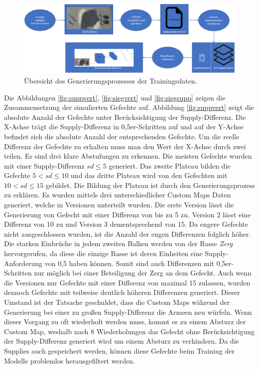 \begin{figure}[H]
\thispagestyle{empty}
\centering
\includegraphics[angle=90,scale=0.6]{pictures/grafiken/Folie2}
\caption{Übersicht des Generierungsprozesses der Trainingsdaten.}
\label{fig:overview1}
\end{figure}

Die Abbildungen \ref{fig:suppvert}, \ref{fig:siegvert} und \ref{fig:siegsupp} zeigen die Zusammensetzung der simulierten Gefechte auf. Abbildung \ref{fig:suppvert} zeigt die absolute Anzahl der Gefechte unter Berücksichtigung der Supply-Differenz. Die X-Achse trägt die Supply-Differenz in 0,5er-Schritten auf und auf der Y-Achse befindet sich die absolute Anzahl der entsprechenden Gefechte. Um die reelle Differenz der Gefechte zu erhalten muss man den Wert der X-Achse durch zwei teilen. Es sind drei klare Abstufungen zu erkennen. Die meisten Gefechte wurden mit einer Supply-Differenz $sd \leq 5$ generiert. Das zweite Plateau bilden die Gefechte $5 < sd \leq 10$ und das dritte Plateau wird von den Gefechten mit $10 < sd \leq 15$  gebildet. Die Bildung der Plateau ist durch den Generierungsprozess zu erklären. Es wurden mittels drei unterschiedlicher Custom Maps Daten generiert, welche in Versionen unterteilt wurden. Die erste Version lässt die Generierung von Gefecht mit einer Differenz von bis zu 5 zu. Version 2 lässt eine Differenz von 10 zu und Version 3 dementsprechend von 15. Da engere Gefechte nicht ausgeschlossen wurden, ist die Anzahl der engen Differenzen folglich höher. Die starken Einbrüche in jedem zweiten Balken werden von der Rasse \textit{Zerg} hervorgerufen, da diese die einzige Rasse ist deren Einheiten eine Supply-Anforderung von 0,5 haben können. Somit sind auch Differenzen mit 0,5er-Schritten nur möglich bei einer Beteiligung der Zerg an dem Gefecht. Auch wenn die Versionen nur Gefechte mit einer Differenz von maximal 15 zulassen, wurden dennoch Gefechte mit teilweise deutlich höheren Differenzen generiert. Dieser Umstand ist der Tatsache geschuldet, dass die Custom Maps während der Generierung bei einer zu großen Supply-Differenz die Armeen neu würfeln. Wenn dieser Vorgang zu oft wiederholt werden muss, kommt es zu einem Absturz der Custom Map, weshalb nach 8 Wiederholungen das Gefecht ohne Berücksichtigung der Supply-Differenz generiert wird um einem Absturz zu verhindern. Da die Supplies auch gespeichert werden, können diese Gefechte beim Training der Modelle problemlos herausgefiltert werden. 

